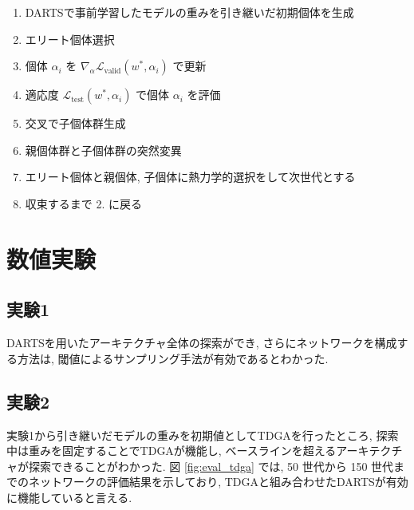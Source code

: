\documentclass[a4paper,twoside,twocolumn,10pt]{article}
\begin{document}
\begin{enumerate}
  \item DARTSで事前学習したモデルの重みを引き継いだ初期個体を生成
  \item エリート個体選択
  \item 個体 $\alpha_i$ を $\displaystyle \nabla_\alpha \mathcal{L}_{\mathrm{valid}}(w^*, \alpha_i)$ で更新
  \item 適応度 $\displaystyle \mathcal{L}_{\mathrm{test}}(w^*, \alpha_i)$ で個体 $\alpha_i$ を評価
  \item 交叉で子個体群生成
  \item 親個体群と子個体群の突然変異
  \item エリート個体と親個体, 子個体に熱力学的選択をして次世代とする
  \item 収束するまで 2. に戻る
\end{enumerate}



\section{数値実験}
\subsection{実験1}
DARTSを用いたアーキテクチャ全体の探索ができ,
さらにネットワークを構成する方法は, 閾値によるサンプリング手法が有効であるとわかった.

\subsection{実験2}
実験1から引き継いだモデルの重みを初期値としてTDGAを行ったところ,
探索中は重みを固定することでTDGAが機能し, ベースラインを超えるアーキテクチャが探索できることがわかった.
図 \ref{fig:eval_tdga} では, 50 世代から 150 世代までのネットワークの評価結果を示しており,
TDGAと組み合わせたDARTSが有効に機能していると言える.
\end{document}
